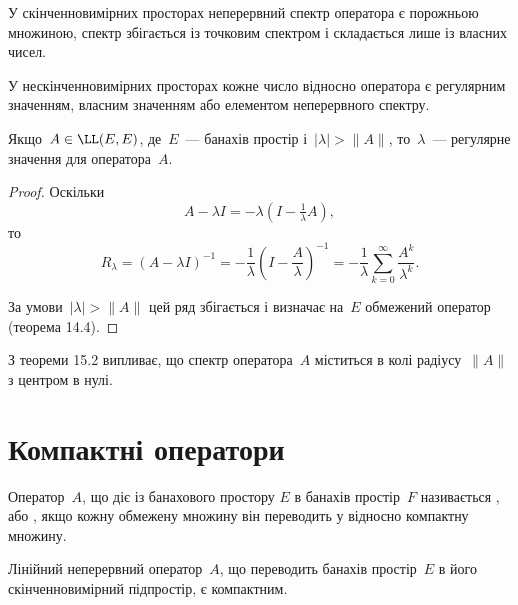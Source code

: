 \begin{remark}
У скінченновимірних просторах
неперервний спектр оператора є порожньою множиною,
спектр збігається із точковим спектром і складається
лише із власних чисел.

У нескінченновимірних просторах
кожне число відносно оператора є регулярним значенням,
власним значенням або елементом неперервного спектру.
\end{remark}

\begin{theorem}
Якщо~$A \in \LL(E, E)$, де~$E$~--- банахів
простір і~$|\lambda| > \|A\|$, то~$\lambda$~--- регулярне значення для
оператора~$A$.
\end{theorem} 

\begin{proof}
Оскільки
\begin{equation*}
    A - \lambda I = - \lambda (I - \tfrac{1}{\lambda} A),
\end{equation*}
то
\begin{equation*}
    R_\lambda = (A - \lambda I)^{-1} =
    -\frac{1}{\lambda} \left( I - \frac{A}{\lambda} \right)^{-1} =
    -\frac{1}{\lambda} \sum_{k = 0}^\infty \frac{A^k}{\lambda^k}.
\end{equation*}

За умови~$|\lambda| > \|A\|$ цей ряд збігається і визначає на~$E$
обмежений оператор (теорема 14.4). 
\end{proof}

\begin{remark}
З теореми 15.2 випливає, що спектр
оператора~$A$ міститься в колі радіусу~$\|A\|$ з центром в нулі.
\end{remark}

\section{Компактні оператори}

\begin{definition}
Оператор~$A$, що діє із банахового простору
$E$ в банахів простір~$F$ називається , або
, якщо кожну обмежену множину він
переводить у відносно компактну множину.
\end{definition}

\begin{example}
Лінійний неперервний оператор~$A$, що
переводить банахів простір~$E$ в його скінченновимірний
підпростір, є компактним.
\end{example}

